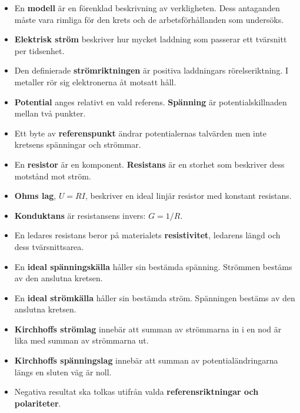 \documentclass[
  swedish,
  11pt,
  a4paper,
  DIV=11,
  numbers=noendperiod,
  twoside,
  open=any]{scrreprt}
\providecommand{\tightlist}{%
  \setlength{\itemsep}{0pt}\setlength{\parskip}{0pt}}
\begin{document}
\begin{itemize}
\tightlist
\item
  En \textbf{modell} är en förenklad beskrivning av verkligheten. Dess
  antaganden måste vara rimliga för den krets och de arbetsförhållanden
  som undersöks.
\item
  \textbf{Elektrisk ström} beskriver hur mycket laddning som passerar
  ett tvärsnitt per tidsenhet.
\item
  Den definierade \textbf{strömriktningen} är positiva laddningars
  rörelseriktning. I metaller rör sig elektronerna åt motsatt håll.
\item
  \textbf{Potential} anges relativt en vald referens. \textbf{Spänning}
  är potentialskillnaden mellan två punkter.
\item
  Ett byte av \textbf{referenspunkt} ändrar potentialernas talvärden men
  inte kretsens spänningar och strömmar.
\item
  En \textbf{resistor} är en komponent. \textbf{Resistans} är en storhet
  som beskriver dess motstånd mot ström.
\item
  \textbf{Ohms lag}, \(U = RI\), beskriver en ideal linjär resistor med
  konstant resistans.
\item
  \textbf{Konduktans} är resistansens invers: \(G = 1/R\).
\item
  En ledares resistans beror på materialets \textbf{resistivitet},
  ledarens längd och dess tvärsnittsarea.
\item
  En \textbf{ideal spänningskälla} håller sin bestämda spänning.
  Strömmen bestäms av den anslutna kretsen.
\item
  En \textbf{ideal strömkälla} håller sin bestämda ström. Spänningen
  bestäms av den anslutna kretsen.
\item
  \textbf{Kirchhoffs strömlag} innebär att summan av strömmarna in i en
  nod är lika med summan av strömmarna ut.
\item
  \textbf{Kirchhoffs spänningslag} innebär att summan av
  potentialändringarna längs en sluten väg är noll.
\item
  Negativa resultat ska tolkas utifrån valda \textbf{referensriktningar
  och polariteter}.
\end{itemize}
\end{document}
